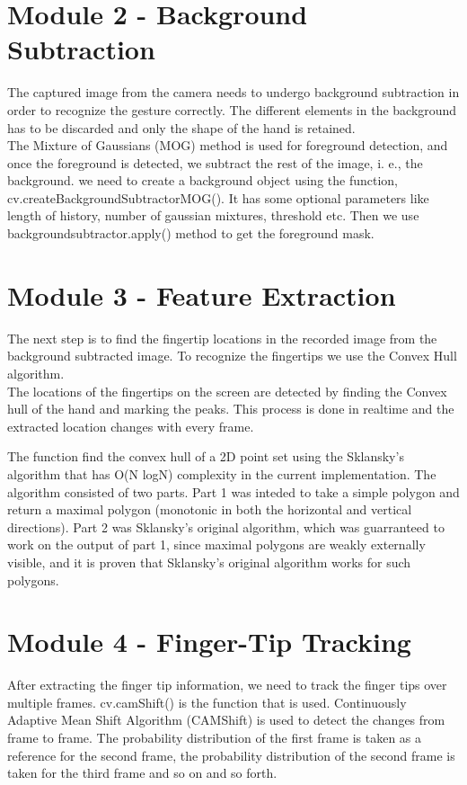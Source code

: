 \documentclass{scrreprt}
\begin{document}
\section{Module 2 - Background Subtraction}
The captured image from the camera needs to undergo background subtraction in order to recognize the gesture correctly. 
The different elements in the background has to be discarded and only the shape of the hand is retained. 
\\
The Mixture of Gaussians (MOG) method is used for foreground detection, and once the foreground is detected, we subtract the rest of the image, i. e., the background.
we need to create a background object using the function, cv.createBackgroundSubtractorMOG(). 
It has some optional parameters like length of history, number of gaussian mixtures, threshold etc. 
Then we use backgroundsubtractor.apply() method to get the foreground mask.
\section{Module 3 - Feature Extraction}
The next step is to find the fingertip locations in the recorded image from the background subtracted image.
To recognize the fingertips we use the Convex Hull algorithm. 
\\
The locations of the fingertips on the screen are detected by finding the Convex hull of the 
hand and marking the peaks. This process is done in realtime and the extracted location changes
 with every frame. 
 
 The function find the convex hull of a 2D point set using the Sklansky’s algorithm
 that has O(N logN) complexity in the current implementation. The algorithm consisted of two parts. 
 Part 1 was inteded to take a simple polygon and return a maximal polygon (monotonic in both the 
 horizontal and vertical directions). Part 2 was Sklansky's original algorithm, which
 was guarranteed to work on the output of part 1, since maximal polygons are weakly externally visible,
 and it is proven that Sklansky's original algorithm works for such polygons.

\section{Module 4 - Finger-Tip Tracking}
After extracting the finger tip information, we need to track the finger tips over multiple frames. 
cv.camShift() is the function that is used. 
Continuously Adaptive Mean Shift Algorithm (CAMShift) is used to detect the changes from frame to frame. 
The probability distribution of the first frame is taken as a reference for the second frame, 
the probability distribution of the second frame is taken for the third frame and so on and so forth.
\end{document}
